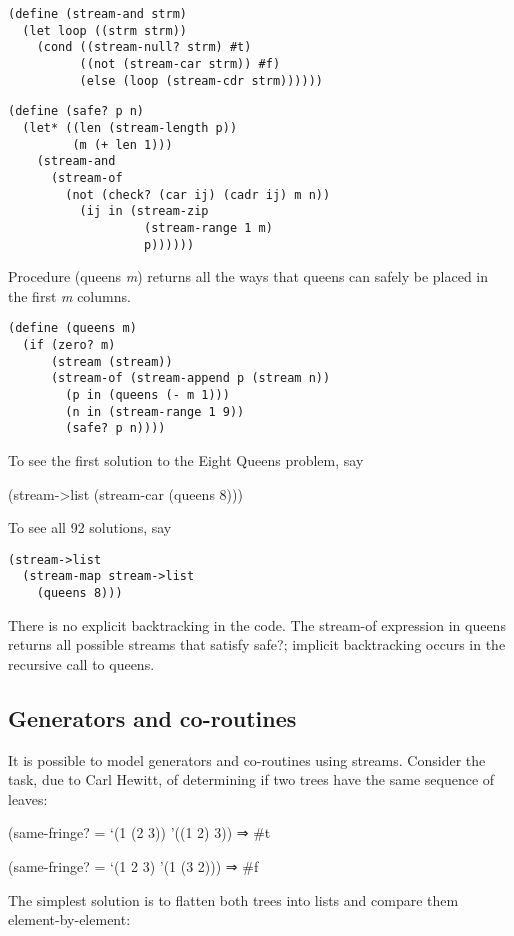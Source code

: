 \begin{verbatim}
(define (stream-and strm)
  (let loop ((strm strm))
    (cond ((stream-null? strm) #t)
          ((not (stream-car strm)) #f)
          (else (loop (stream-cdr strm))))))
\end{verbatim}

\begin{verbatim}
(define (safe? p n)
  (let* ((len (stream-length p))
         (m (+ len 1)))
    (stream-and
      (stream-of
        (not (check? (car ij) (cadr ij) m n))
          (ij in (stream-zip
                   (stream-range 1 m)
                   p))))))
\end{verbatim}

Procedure (queens \emph{m}) returns all the ways that queens can safely
be placed in the first \emph{m} columns.

\begin{verbatim}
(define (queens m)
  (if (zero? m)
      (stream (stream))
      (stream-of (stream-append p (stream n))
        (p in (queens (- m 1)))
        (n in (stream-range 1 9))
        (safe? p n))))
\end{verbatim}

To see the first solution to the Eight Queens problem, say

(stream-\textgreater{}list (stream-car (queens 8)))

To see all 92 solutions, say

\begin{verbatim}
(stream->list
  (stream-map stream->list
    (queens 8)))
\end{verbatim}

There is no explicit backtracking in the code. The stream-of expression
in queens returns all possible streams that satisfy safe?; implicit
backtracking occurs in the recursive call to queens.

\subsection{Generators and
co-routines}\label{generators-and-co-routines}

It is possible to model generators and co-routines using streams.
Consider the task, due to Carl Hewitt, of determining if two trees have
the same sequence of leaves:

(same-fringe? = `(1 (2 3)) '((1 2) 3)) ⇒ \#t

(same-fringe? = `(1 2 3) '(1 (3 2))) ⇒ \#f

The simplest solution is to flatten both trees into lists and compare
them element-by-element:

